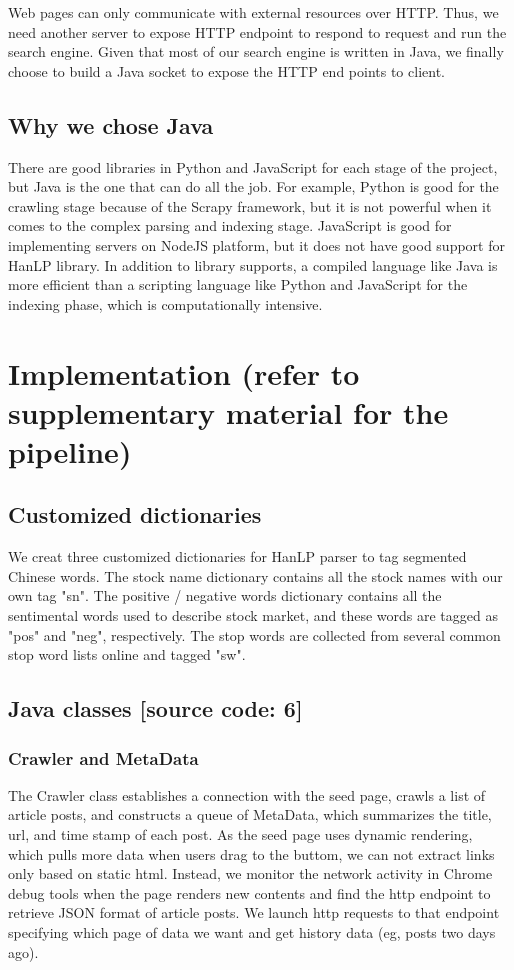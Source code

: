 \documentclass{article}
\begin{document}
Web pages can only communicate with external resources over HTTP. Thus, we need another server to expose HTTP endpoint to respond to request and run the search engine. Given that most of our search engine is written in Java, we finally choose to build a Java socket to expose the HTTP end points to client.

\subsection{Why we chose Java}
There are good libraries in Python and JavaScript for each stage of the project, but Java is the one that can do all the job. For example, Python is good for the crawling stage because of the Scrapy framework, but it is not powerful when it comes to the complex parsing and indexing stage. JavaScript is good for implementing servers on NodeJS platform, but it does not have good support for HanLP library. In addition to library supports, a compiled language like Java is more efficient than a scripting language like Python and JavaScript for the indexing phase, which is computationally intensive.

\section{Implementation (refer to supplementary material for the pipeline)}
\subsection{Customized dictionaries}
We creat three customized dictionaries for HanLP parser to tag segmented Chinese words. The stock name dictionary contains all the stock names with our own tag "sn". The positive / negative words dictionary contains all the sentimental words used to describe stock market, and these words are tagged as "pos" and "neg", respectively. The stop words are collected from several common stop word lists online and tagged "sw".

\subsection{Java classes [source code: 6]}
\subsubsection{Crawler and MetaData}
The Crawler class establishes a connection with the seed page, crawls a list of article posts, and constructs a queue of MetaData, which summarizes the title, url, and time stamp of each post. As the seed page uses dynamic rendering, which pulls more data when users drag to the buttom, we can not extract links only based on static html. Instead, we monitor the network activity in Chrome debug tools when the page renders new contents and find the http endpoint to retrieve JSON format of article posts. We launch http requests to that endpoint specifying which page of data we want and get history data (eg, posts two days ago).
\end{document}
